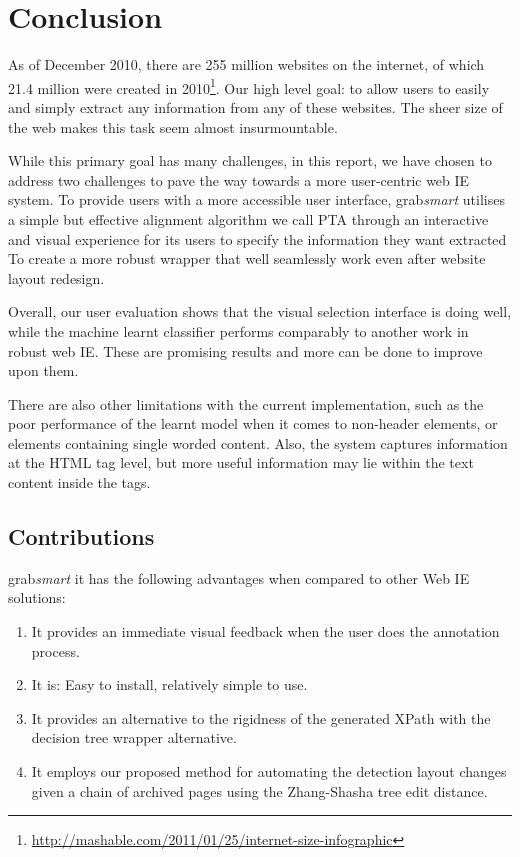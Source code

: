  \chapter{Conclusion}
As of December 2010, there are 255 million websites on the internet, of which 21.4 million
were created in 2010\footnote{\url{http://mashable.com/2011/01/25/internet-size-infographic}}.
Our high level goal: to allow users to easily and simply extract any information from any 
of these websites. The sheer size of the web makes this task seem almost insurmountable.

While this primary goal has many challenges, in this report, we have chosen to address 
two challenges to pave the way towards a more user-centric web IE system. To provide users with a more accessible
user interface, grab\textit{smart} utilises a simple but effective alignment algorithm we call
PTA through an interactive and visual experience for its users to specify the information they want extracted
To create a more robust wrapper that well seamlessly work even after website layout redesign.

Overall, our user evaluation shows that the visual selection interface is doing well, 
while the machine learnt classifier performs comparably to another work in robust 
web IE. These are promising results and more can be done to improve upon them.

There are also other limitations with the current implementation, such as the poor performance of
the learnt model when it comes to non-header elements, or elements containing single worded
content. Also, the system captures information at the HTML tag level, but more useful information
may lie within the text content inside the tags.

\section{Contributions}
grab\textit{smart} it has the following advantages when compared to other Web IE solutions:
\begin{enumerate}
	\item It provides an immediate visual feedback when the user does the annotation process.
	\item It is: Easy to install, relatively simple to use.
	\item It provides an alternative to the rigidness of the generated XPath with the decision
	tree wrapper alternative.
	\item It employs our proposed method for automating the detection layout changes given
	a chain of archived pages using the Zhang-Shasha tree edit distance.
\end{enumerate}

